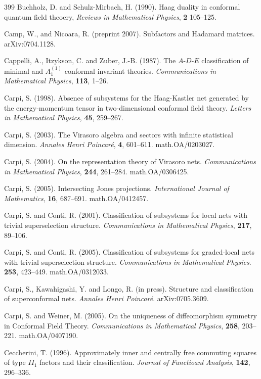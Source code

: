 \documentclass[12pt]{article}
\theoremstyle{plain}
\theoremstyle{definition}
\numberwithin{equation}{section}
\begin{document}
\begin{thebibliography} {399}
Buchholz, D. and Schulz-Mirbach, H. (1990).
Haag duality in conformal quantum field theoery, 
{\em Reviews in Mathematical Physics}, {\bf 2} 105--125.

Camp, W., and Nicoara, R. (preprint 2007).
Subfactors and Hadamard matrices.
arXiv:0704.1128.

Cappelli, A., Itzykson, C. and Zuber, J.-B. (1987).
The $A$-$D$-$E$ classification of minimal and
$A^{(1)}_1$ conformal invariant theories.
{\em Communications in Mathematical Physics},  {\bf 113}, 1--26.

Carpi, S. (1998).
Absence of subsystems for the Haag-Kastler net generated by 
the energy-momentum tensor in two-dimensional conformal field theory.
{\em Letters in Mathematical Physics}, {\bf 45}, 259--267.

Carpi, S. (2003).
The Virasoro algebra and sectors with infinite statistical dimension.
{\em Annales Henri Poincar\'e}, {\bf 4}, 601--611.
math.OA/0203027.

Carpi, S. (2004).
On the representation theory of Virasoro nets.
{\em Communications in Mathematical Physics}, {\bf 244}, 261--284.
math.OA/0306425.

Carpi, S. (2005).
Intersecting Jones projections.
{\em International Journal of Mathematics}, {\bf 16}, 687--691.
math.OA/0412457.

Carpi, S. and Conti, R. (2001).
Classification of subsystems for local nets with trivial
superselection structure.
{\em Communications in Mathematical Physics},  {\bf 217}, 89--106.

Carpi, S. and Conti, R. (2005).
Classification of subsystems for graded-local nets with trivial 
superselection structure.
{\em Communications in Mathematical Physics}.
{\bf 253}, 423--449.
math.OA/0312033.

Carpi, S., Kawahigashi, Y. and Longo, R. (in press).
Structure and classification of superconformal nets.
{\em Annales Henri Poincar\'e}.
arXiv:0705.3609.

Carpi, S. and Weiner, M. (2005).
On the uniqueness of diffeomorphism symmetry in Conformal Field Theory.
{\em Communications in Mathematical Physics},
{\bf 258}, 203--221.
math.OA/0407190.

Ceccherini, T. (1996).
Approximately inner and centrally free commuting squares
of type $II_1$ factors and their classification.
{\em Journal of Functioanl Analysis}, {\bf 142}, 296--336.


\end{thebibliography}
\end{document}
